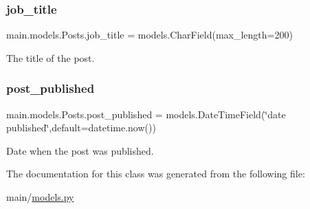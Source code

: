 \subsubsection{\texorpdfstring{job\+\_\+title}{job\_title}}
{\footnotesize\ttfamily main.\+models.\+Posts.\+job\+\_\+title = models.\+Char\+Field(max\+\_\+length=200)\hspace{0.3cm}{\ttfamily [static]}}



The title of the post. 

\mbox{\label{classmain_1_1models_1_1Posts_a6e0e50f0ed5e44dc5b275de570745348}} 
\subsubsection{\texorpdfstring{post\+\_\+published}{post\_published}}
{\footnotesize\ttfamily main.\+models.\+Posts.\+post\+\_\+published = models.\+Date\+Time\+Field(\char`\"{}date published\char`\"{},default=datetime.\+now())\hspace{0.3cm}{\ttfamily [static]}}



Date when the post was published. 



The documentation for this class was generated from the following file\+:\begin{DoxyCompactItemize}
\item 
main/\hyperlink{models_8py}{models.\+py}\end{DoxyCompactItemize}
